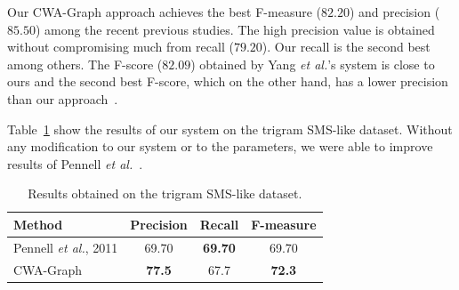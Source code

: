 \documentclass[a4paper,onesided,12pt]{report}
\begin{document}
Our CWA-Graph approach achieves the best F-measure ($82.20$) and precision ($85.50$) among the recent previous studies. The high precision value is obtained without compromising much from recall ($79.20$). Our recall is the second best among others. The F-score ($82.09$) obtained by Yang \textit{et al.}'s system is close to ours and the second best F-score, which on the other hand, has a lower precision than our approach~\cite{DBLP:conf/emnlp/YangE13}.


Table~\ref{tab:resultspennell} show the results of our system on the trigram SMS-like dataset. Without any modification to our system or to the parameters, we were able to improve results of Pennell \textit{et al.}~\cite{pennell2011character}.

\begin{table}[thb]
  \caption{Results obtained on the trigram SMS-like dataset.}
  \centering
  \begin{tabular}[t]{|l|c|c|c|}
    \hline
    \textbf{Method} & \textbf{Precision} & \textbf{Recall} & \textbf{F-measure} \\
    \hline
    Pennell \textit{et al.}, 2011 & 69.70 & \textbf{69.70} & 69.70 \\\hline
    CWA-Graph   &  \textbf{77.5} & 67.7  &  \textbf{72.3} \\\hline
  \end{tabular}
  \label{tab:resultspennell}
\end{table}
\end{document}
